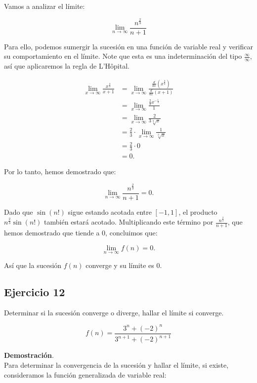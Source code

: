 \documentclass{article}
\begin{document}
    Vamos a analizar el límite:

    \[
    \lim _{n \rightarrow \infty} \frac{n^{\frac{2}{3}}}{n+1}
    \]

    Para ello, podemos sumergir la sucesión en una función de variable real y verificar su comportamiento en el límite. Note que esta es una indeterminación del tipo $\frac{\infty}{\infty}$, así que aplicaremos la regla de L'Hôpital.

    \begin{align*}
    \lim _{x \rightarrow \infty} \frac{x^{\frac{2}{3}}}{x+1} &= \lim _{x \rightarrow \infty} \frac{\frac{d}{dx} \left( x^{\frac{2}{3}} \right)}{\frac{d}{dx} \left( x+1 \right)} \\
    &= \lim _{x \rightarrow \infty} \frac{\frac{2}{3} x^{-\frac{1}{3}}}{1} \\
    &= \lim _{x \rightarrow \infty} \frac{2}{3 \sqrt[3]{x}} \\
    &= \frac{2}{3} \cdot \lim _{x \rightarrow \infty} \frac{1}{\sqrt[3]{x}} \\
    &= \frac{2}{3} \cdot 0 \\
    &= 0.
    \end{align*}

    Por lo tanto, hemos demostrado que:

    \[
    \lim _{n \rightarrow \infty} \frac{n^{\frac{2}{3}}}{n+1} = 0.
    \]

    Dado que $\sin(n!)$ sigue estando acotada entre $[-1,1]$, el producto $n^{\frac{2}{3}} \sin(n!)$ también estará acotado. Multiplicando este término por $\frac{n^{\frac{2}{3}}}{n+1}$, que hemos demostrado que tiende a 0, concluimos que:

    \[
    \lim _{n \rightarrow \infty} f(n) = 0.
    \]

    Así que la sucesión $f(n)$ converge y su límite es 0.

    \subsection*{Ejercicio 12}

    Determinar si la sucesión converge o diverge, hallar el límite si converge.

    $$
    f(n)=\frac{3^{n}+(-2)^{n}}{3^{n+1}+(-2)^{n+1}}
    $$

    \textbf{Demostración}.\\

    Para determinar la convergencia de la sucesión y hallar el límite, si existe, consideramos la función generalizada de variable real:
\end{document}

